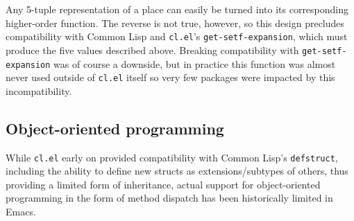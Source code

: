 \documentclass[format=acmsmall, review]{acmart}
\begin{document}
Any 5-tuple representation of a place can easily be turned into
its corresponding higher-order function.  The reverse is not true, however, so
this design precludes compatibility with Common Lisp and
\texttt{cl.el}'s \texttt{get-setf-expansion}, which must produce the
five values described above.
Breaking compatibility with \texttt{get-setf-expansion}
was of course
a downside, but in practice this function was almost never used outside of
\texttt{cl.el} itself so very few packages were impacted by
this incompatibility.


\subsection{Object-oriented programming} %
\label{sec:oop}

While \texttt{cl.el} early on provided compatibility with Common
Lisp's \texttt{defstruct}, including the
ability to define new structs as extensions/subtypes of others, thus
providing a limited form of inheritance, actual support for object-oriented
programming in the form of method dispatch has been historically limited
in Emacs.
\end{document}
